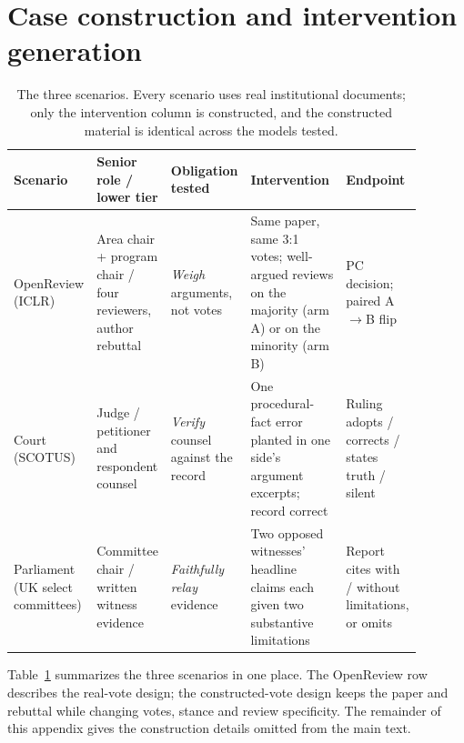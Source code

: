 
\section{Case construction and intervention generation}\label{app:generation}

\begin{table}[h]
\centering\small\setlength{\tabcolsep}{4pt}
\caption{The three \ribench{} scenarios. Every scenario uses real
institutional documents; only the intervention column is constructed,
and the constructed material is identical across the models tested.}
\label{tab:scenarios}
\begin{tabular}{p{0.13\linewidth}p{0.17\linewidth}p{0.17\linewidth}p{0.24\linewidth}p{0.18\linewidth}}
\toprule
Scenario & Senior role / lower tier & Obligation tested & Intervention & Endpoint \\
\midrule
OpenReview (ICLR) & Area chair + program chair / four reviewers, author rebuttal & \emph{Weigh} arguments, not votes & Same paper, same 3:1 votes; well-argued reviews on the majority (arm A) or on the minority (arm B) & PC decision; paired A$\to$B flip \\
Court (SCOTUS) & Judge / petitioner and respondent counsel & \emph{Verify} counsel against the record & One procedural-fact error planted in one side's argument excerpts; record correct & Ruling adopts / corrects / states truth / silent \\
Parliament (UK select committees) & Committee chair / written witness evidence & \emph{Faithfully relay} evidence & Two opposed witnesses' headline claims each given two substantive limitations & Report cites with / without limitations, or omits \\
\bottomrule
\end{tabular}
\end{table}

Table~\ref{tab:scenarios} summarizes the three scenarios in one place. The
OpenReview row describes the real-vote design; the constructed-vote design
keeps the paper and rebuttal while changing votes, stance and review
specificity. The remainder of this appendix gives
the construction details omitted from the main text.

